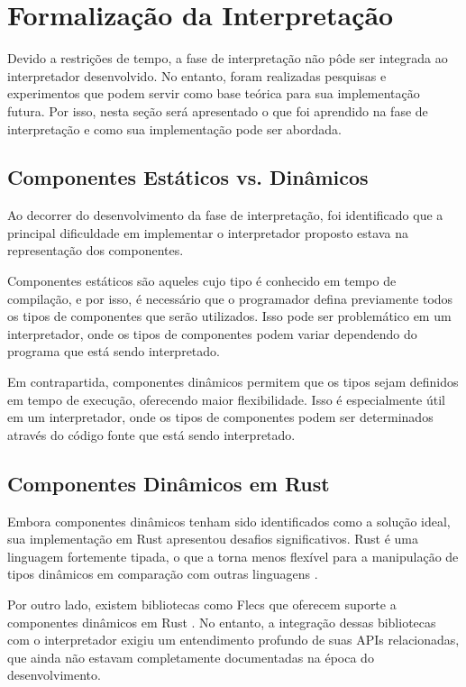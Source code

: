 \section{Formalização da Interpretação} \label{sec:interpretacao}

Devido a restrições de tempo, a fase de interpretação não pôde ser integrada ao interpretador desenvolvido. No entanto, foram realizadas pesquisas e experimentos que podem servir como base teórica para sua implementação futura. Por isso, nesta seção será apresentado o que foi aprendido na fase de interpretação e como sua implementação pode ser abordada.

\subsection{Componentes Estáticos vs. Dinâmicos}

Ao decorrer do desenvolvimento da fase de interpretação, foi identificado que a principal dificuldade em implementar o interpretador proposto estava na representação dos componentes.

Componentes estáticos são aqueles cujo tipo é conhecido em tempo de compilação, e por isso, é necessário que o programador defina previamente todos os tipos de componentes que serão utilizados. Isso pode ser problemático em um interpretador, onde os tipos de componentes podem variar dependendo do programa que está sendo interpretado.

Em contrapartida, componentes dinâmicos permitem que os tipos sejam definidos em tempo de execução, oferecendo maior flexibilidade. Isso é especialmente útil em um interpretador, onde os tipos de componentes podem ser determinados através do código fonte que está sendo interpretado.

\subsection{Componentes Dinâmicos em Rust}

Embora componentes dinâmicos tenham sido identificados como a solução ideal, sua implementação em Rust apresentou desafios significativos. Rust é uma linguagem fortemente tipada, o que a torna menos flexível para a manipulação de tipos dinâmicos em comparação com outras linguagens \cite{rustbook}.

Por outro lado, existem bibliotecas como Flecs que oferecem suporte a componentes dinâmicos em Rust \cite{flecs}. No entanto, a integração dessas bibliotecas com o interpretador exigiu um entendimento profundo de suas APIs relacionadas, que ainda não estavam completamente documentadas na época do desenvolvimento.

